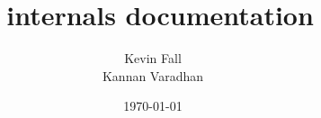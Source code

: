 \documentclass{article}
\begin{document}
\title{\nsTcl\ internals documentation}
\author{%
  Kevin Fall \\
  Kannan Varadhan }
\date{\today}

\def\c#1{\ensuremath{C_{#1}}}
\def\d#1{\ensuremath{D_{#1}}}



\end{document}
